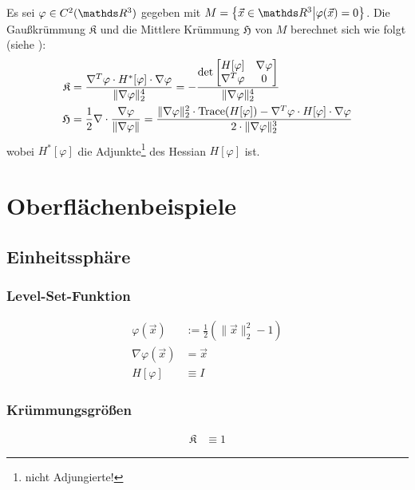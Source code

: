   Es sei \( \varphi\in C^{2}(\R^{3}) \) gegeben mit \( M = \left\{ \vec{x}\in\R^{3} \middle| \varphi(\vec{x}) = 0 \right\} \).
  Die Gaußkrümmung \( \mathfrak{K} \) und die Mittlere Krümmung \( \mathfrak{H} \) von \( M \) berechnet sich wie folgt (siehe \cite{CurvatureFormulas}):
  \begin{align}
    \mathfrak{K} &= \frac{\nabla^{T}\varphi \cdot H^{*}[\varphi] \cdot \nabla\varphi}{ \|\nabla\varphi\|_{2}^{4}}
                 = - \frac{\det \begin{bmatrix} H[\varphi] & \nabla\varphi \\ \nabla^{T}\varphi & 0 \end{bmatrix}}{\|\nabla\varphi\|_{2}^{4}} \\
    \mathfrak{H} &= \frac{1}{2}\nabla \cdot \frac{\nabla\varphi}{\|\nabla\varphi\|}
          = \frac{\|\nabla\varphi\|_{2}^{2}\cdot\text{Trace}(H[\varphi]) - \nabla^{T}\varphi \cdot H[\varphi] \cdot \nabla\varphi }
                        {2\cdot\|\nabla\varphi\|_{2}^{3}}
  \end{align}
  wobei \( H^{*}[\varphi] \) die Adjunkte\footnote{nicht Adjungierte!} des Hessian \( H[\varphi] \) ist.


\section{Oberflächenbeispiele}

  \subsection{Einheitssphäre}
    \label{sphere}

    \subsubsection{Level-Set-Funktion}
      \begin{align}
        \varphi(\vec{x}) &:= \frac{1}{2}\left( \|\vec{x}\|_{2}^{2} - 1 \right) \\
        \nabla\varphi(\vec{x}) &= \vec{x} \\
        H[\varphi] &\equiv I
      \end{align}

     \subsubsection{Krümmungsgrößen}
      \begin{align}
        \mathfrak{K} &\equiv 1
      \end{align}

